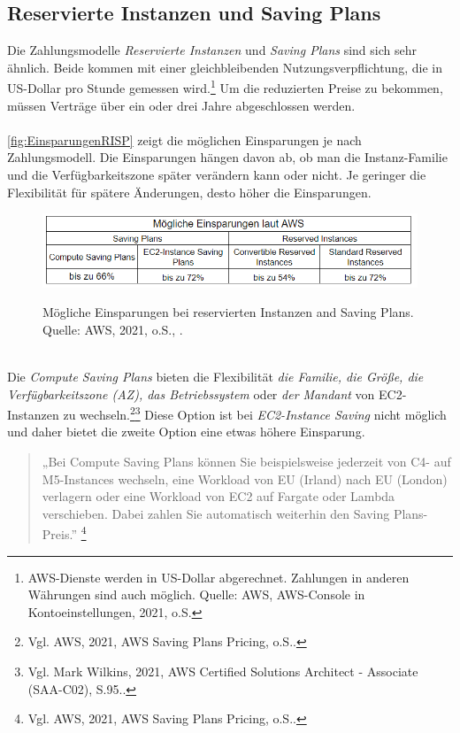 \subsection{Reservierte Instanzen und Saving Plans}
Die Zahlungsmodelle \textit{Reservierte Instanzen} und \textit{Saving Plans} sind sich sehr ähnlich. Beide kommen mit einer gleichbleibenden  Nutzungsverpflichtung, die in US-Dollar pro Stunde gemessen wird.\footnote{AWS-Dienste werden in US-Dollar abgerechnet. Zahlungen in anderen Währungen sind auch möglich. Quelle: AWS, AWS-Console in Kontoeinstellungen, 2021, o.S.} Um die reduzierten Preise  zu bekommen, müssen Verträge über ein oder drei Jahre abgeschlossen werden. 
\\\\
\autoref{fig:EinsparungenRISP} zeigt die möglichen Einsparungen je nach Zahlungsmodell. Die Einsparungen hängen davon ab, ob man die Instanz-Familie und die Verfügbarkeitszone später verändern kann oder nicht. Je geringer die Flexibilität für spätere Änderungen, desto höher die Einsparungen.
\begin{figure}[h!]
  \centering
  \includegraphics[scale=0.9]{sources/EinsparungenRISP}\label{fig:EinsparungenRISP}\\
  \caption[Mögliche Einsparungen bei reservierten Instanzen and Saving Plans laut AWS]{}
  \label{fig:EinsparungenRISP}
  Mögliche Einsparungen bei reservierten Instanzen and Saving Plans.\\
  Quelle: AWS, 2021, o.S., \cite{AMZ07,AMZ11}.
\end{figure}
\\
Die \textit{Compute Saving Plans} bieten die Flexibilität \textit{die Familie, die Größe, die Verfügbarkeitszone (AZ), das Betriebssystem} oder \textit{der Mandant} von EC2-Instanzen zu wechseln.\footnote{Vgl. AWS, 2021, AWS Saving Plans Pricing, o.S.\cite{AMZ11}.}\footnote{Vgl. Mark Wilkins, 2021, AWS Certified Solutions Architect - Associate (SAA-C02), S.95.\cite{AWS1}.} Diese Option ist bei \textit{EC2-Instance Saving} nicht möglich und daher bietet die zweite Option eine etwas höhere Einsparung.
\begin{quote}
    „Bei Compute Saving Plans können Sie beispielsweise jederzeit von C4- auf M5-Instances wechseln, eine Workload von EU (Irland) nach EU (London) verlagern oder eine Workload von EC2 auf Fargate oder Lambda verschieben. Dabei zahlen Sie automatisch weiterhin den Saving Plans-Preis.”
    \footnote{Vgl. AWS, 2021, AWS Saving Plans Pricing, o.S.\cite{AMZ11}.}
\end{quote}
